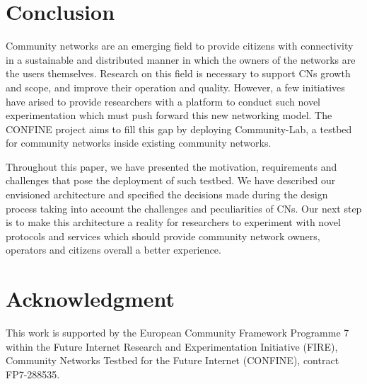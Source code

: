 \documentclass[conference]{IEEEtran}
\begin{document}
\section{Conclusion}

Community networks are an emerging field to provide citizens with connectivity in a sustainable and
distributed manner in which the owners of the networks are the users themselves. Research on this field
is necessary to support CNs growth and scope, and improve their operation and quality. However, a few initiatives
have arised to provide researchers with a platform to conduct such novel experimentation which must
push forward this new networking model. The CONFINE project aims to fill this gap by deploying Community-Lab,
a testbed for community networks inside existing community networks. 

Throughout this paper, we have presented the motivation, requirements and challenges that pose the deployment
of such testbed. We have described our envisioned architecture and specified the decisions made during
the design process taking into account the challenges and peculiarities of CNs. Our next step is to make this
architecture a reality for researchers to experiment with novel protocols and services which should
provide community network owners, operators and citizens overall a better experience.

\section*{Acknowledgment}

This work is supported by the European Community Framework Programme 7
within the Future Internet Research and Experimentation Initiative
(FIRE), Community Networks Testbed for the Future Internet (CONFINE),
contract FP7-288535.








\end{document}
